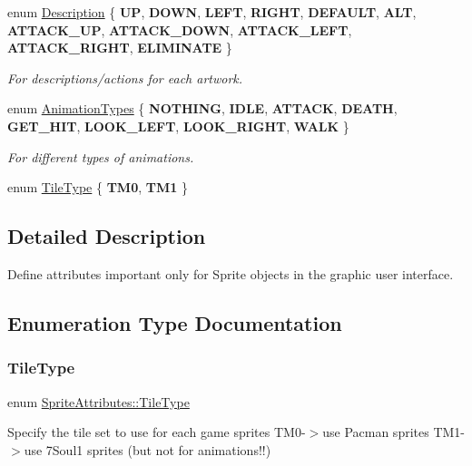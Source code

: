 \begin{DoxyCompactItemize}
enum \mbox{\hyperlink{namespace_sprite_attributes_a3ece96d6288b14d53d84e2138392395c}{Description}} \{ \newline
{\bfseries UP}, 
{\bfseries D\+O\+WN}, 
{\bfseries L\+E\+FT}, 
{\bfseries R\+I\+G\+HT}, 
\newline
{\bfseries D\+E\+F\+A\+U\+LT}, 
{\bfseries A\+LT}, 
{\bfseries A\+T\+T\+A\+C\+K\+\_\+\+UP}, 
{\bfseries A\+T\+T\+A\+C\+K\+\_\+\+D\+O\+WN}, 
\newline
{\bfseries A\+T\+T\+A\+C\+K\+\_\+\+L\+E\+FT}, 
{\bfseries A\+T\+T\+A\+C\+K\+\_\+\+R\+I\+G\+HT}, 
{\bfseries E\+L\+I\+M\+I\+N\+A\+TE}
 \}
\begin{DoxyCompactList}\small\item\em For descriptions/actions for each artwork. \end{DoxyCompactList}\item 
\mbox{\label{namespace_sprite_attributes_ae1a753cb32f500b34381aac4b197b3a7}} 
enum \mbox{\hyperlink{namespace_sprite_attributes_ae1a753cb32f500b34381aac4b197b3a7}{Animation\+Types}} \{ \newline
{\bfseries N\+O\+T\+H\+I\+NG}, 
{\bfseries I\+D\+LE}, 
{\bfseries A\+T\+T\+A\+CK}, 
{\bfseries D\+E\+A\+TH}, 
\newline
{\bfseries G\+E\+T\+\_\+\+H\+IT}, 
{\bfseries L\+O\+O\+K\+\_\+\+L\+E\+FT}, 
{\bfseries L\+O\+O\+K\+\_\+\+R\+I\+G\+HT}, 
{\bfseries W\+A\+LK}
 \}
\begin{DoxyCompactList}\small\item\em For different types of animations. \end{DoxyCompactList}\item 
enum \mbox{\hyperlink{namespace_sprite_attributes_a254503d1929a87fa82146c9b7d19c2df}{Tile\+Type}} \{ {\bfseries T\+M0}, 
{\bfseries T\+M1}
 \}
\end{DoxyCompactItemize}


\subsection{Detailed Description}
Define attributes important only for Sprite objects in the graphic user interface. 

\subsection{Enumeration Type Documentation}
\mbox{\label{namespace_sprite_attributes_a254503d1929a87fa82146c9b7d19c2df}} 
\subsubsection{\texorpdfstring{Tile\+Type}{TileType}}
{\footnotesize\ttfamily enum \mbox{\hyperlink{namespace_sprite_attributes_a254503d1929a87fa82146c9b7d19c2df}{Sprite\+Attributes\+::\+Tile\+Type}}}

Specify the tile set to use for each game sprites T\+M0-\/$>$use Pacman sprites T\+M1-\/$>$use 7\+Soul1 sprites (but not for animations!!) 